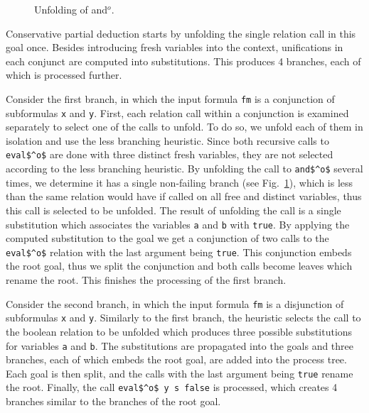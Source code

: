\begin{figure}[!t]
  \centering
  \begin{minipage}{0.95\textwidth}
    
  \end{minipage}
  \caption{Unfolding of and$^o$.}
  \label{fig:and}
\end{figure}


Conservative partial deduction starts by unfolding the single relation call in this goal once.
Besides introducing fresh variables into the context, unifications in each conjunct are computed into substitutions.
This produces 4 branches, each of which is processed further.

Consider the first branch, in which the input formula \lstinline{fm} is a conjunction of subformulas \lstinline{x} and \lstinline{y}.
First, each relation call within a conjunction is examined separately to select one of the calls to unfold.
To do so, we unfold each of them in isolation and use the less branching heuristic.
Since both recursive calls to \lstinline{eval$^o$} are done with three distinct fresh variables, they are not selected according to the less branching heuristic.
By unfolding the call to \lstinline{and$^o$} several times, we determine it has a single non-failing branch (see Fig.~\ref{fig:and}), which is less than the same relation would have if called on all free and distinct variables, thus this call is selected to be unfolded.
The result of unfolding the call is a single substitution which associates the variables \lstinline{a} and \lstinline{b} with \lstinline{true}.
By applying the computed substitution to the goal we get a conjunction of two calls to the \lstinline{eval$^o$} relation with the last argument being \lstinline{true}.
This conjunction embeds the root goal, thus we split the conjunction and both calls become leaves which rename the root.
This finishes the processing of the first branch.

Consider the second branch, in which the input formula \lstinline{fm} is a disjunction of subformulas \lstinline{x} and \lstinline{y}.
Similarly to the first branch, the heuristic selects the call to the boolean relation to be unfolded which produces three possible substitutions for variables \lstinline{a} and \lstinline{b}.
The substitutions are propagated into the goals and three branches, each of which embeds the root goal, are added into the process tree.
Each goal is then split, and the calls with the last argument being \lstinline{true} rename the root.
Finally, the call \lstinline{eval$^o$ y s false} is processed, which creates 4 branches similar to the branches of the root goal.


